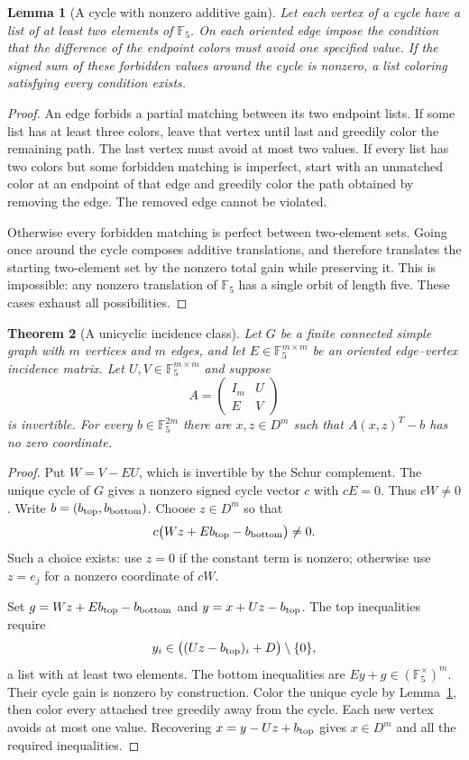 \documentclass[11pt,a4paper]{article}
\newtheorem{theorem}{Theorem}
\newtheorem{lemma}[theorem]{Lemma}
\newcommand{\F}{\mathbb F_5}
\begin{document}
\begin{lemma}[A cycle with nonzero additive gain]\label{lem:cycle}
Let each vertex of a cycle have a list of at least two elements of $\F$.
On each oriented edge impose the condition that the difference of the
endpoint colors must avoid one specified value. If the signed sum of
these forbidden values around the cycle is nonzero, a list coloring
satisfying every condition exists.
\end{lemma}
\begin{proof}
An edge forbids a partial matching between its two endpoint lists.
If some list has at least three colors, leave that vertex until last
and greedily color the remaining path. The last vertex must avoid at
most two values. If every list has two colors but some forbidden
matching is imperfect, start with an unmatched color at an endpoint
of that edge and greedily color the path obtained by removing the edge.
The removed edge cannot be violated.

Otherwise every forbidden matching is perfect between two-element
sets. Going once around the cycle composes additive translations,
and therefore translates the starting two-element set by the nonzero
total gain while preserving it. This is impossible: any nonzero
translation of $\F$ has a single orbit of length five. These cases
exhaust all possibilities.
\end{proof}

\begin{theorem}[A unicyclic incidence class]\label{thm:unicyclic}
Let $G$ be a finite connected simple graph with $m$ vertices and $m$
edges, and let $E\in\F^{m\times m}$ be an oriented edge--vertex
incidence matrix. Let $U,V\in\F^{m\times m}$ and suppose
\[
 A=\begin{pmatrix}I_m&U\\E&V\end{pmatrix}
\]
is invertible. For every $b\in\F^{2m}$ there are $x,z\in D^m$ such
that $A(x,z)^T-b$ has no zero coordinate.
\end{theorem}
\begin{proof}
Put $W=V-EU$, which is invertible by the Schur complement.
The unique cycle of $G$ gives a nonzero signed cycle vector $c$ with
$cE=0$. Thus $cW\ne0$. Write $b=(b_{\rm top},b_{\rm bottom})$.
Choose $z\in D^m$ so that
\[
 c\bigl(Wz+Eb_{\rm top}-b_{\rm bottom}\bigr)\ne0.
\]
Such a choice exists: use $z=0$ if the constant term is nonzero;
otherwise use $z=e_j$ for a nonzero coordinate of $cW$.

Set $g=Wz+Eb_{\rm top}-b_{\rm bottom}$ and
$y=x+Uz-b_{\rm top}$. The top inequalities require
\[
 y_i\in\bigl((Uz-b_{\rm top})_i+D\bigr)\setminus\{0\},
\]
a list with at least two elements. The bottom inequalities are
$Ey+g\in(\F^\times)^m$. Their cycle gain is nonzero by construction.
Color the unique cycle by Lemma~\ref{lem:cycle}, then color every
attached tree greedily away from the cycle. Each new vertex avoids
at most one value. Recovering $x=y-Uz+b_{\rm top}$ gives $x\in D^m$
and all the required inequalities.
\end{proof}
\end{document}
